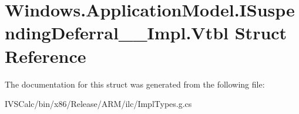 \hypertarget{struct_windows_1_1_application_model_1_1_i_suspending_deferral_____impl_1_1_vtbl}{}\section{Windows.\+Application\+Model.\+I\+Suspending\+Deferral\+\_\+\+\_\+\+Impl.\+Vtbl Struct Reference}
\label{struct_windows_1_1_application_model_1_1_i_suspending_deferral_____impl_1_1_vtbl}


The documentation for this struct was generated from the following file\+:\begin{DoxyCompactItemize}
\item 
I\+V\+S\+Calc/bin/x86/\+Release/\+A\+R\+M/ilc/Impl\+Types.\+g.\+cs\end{DoxyCompactItemize}
